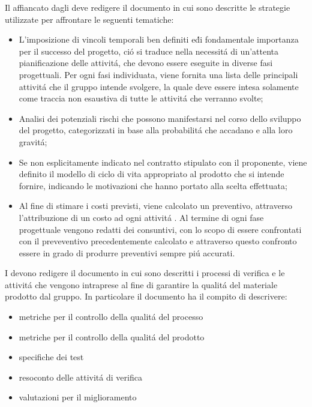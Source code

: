 Il \responsabile{} affiancato dagli \amministratori{} deve redigere il documento \PdPv{} in cui sono descritte le strategie utilizzate per affrontare le seguenti tematiche:

\begin{itemize}
    \item L'imposizione di vincoli temporali ben definiti e\' di fondamentale importanza per il successo del progetto, ci\'o si traduce nella necessit\'a di un'attenta pianificazione delle attivit\'a, che devono essere eseguite in diverse fasi progettuali. Per ogni fasi individuata, viene fornita una lista delle principali attivit\'a che il gruppo intende svolgere, la quale deve essere intesa solamente come traccia non esaustiva di tutte le attivit\'a che verranno svolte;
    \item Analisi dei potenziali rischi che possono manifestarsi nel corso dello sviluppo del progetto, categorizzati in base alla probabilit\'a che accadano e alla loro gravit\'a;
    \item Se non esplicitamente indicato nel contratto stipulato con il proponente, viene definito il modello di ciclo di vita appropriato al prodotto che si intende fornire, indicando le motivazioni che hanno portato alla scelta effettuata;
    \item Al fine di stimare i costi previsti, viene calcolato un preventivo, attraverso l'attribuzione di un costo ad ogni attivit\'a . Al termine di ogni fase progettuale vengono redatti dei consuntivi, con lo scopo di essere confrontati con il preveventivo precedentemente calcolato e attraverso questo confronto essere in grado di produrre preventivi sempre pi\'u accurati.
\end{itemize}

I \verificatori{} devono redigere il documento \PdQv{} in cui sono descritti i processi di verifica e le attivit\'a che vengono intraprese al fine di garantire la qualit\'a del materiale prodotto dal gruppo. In particolare il documento ha il compito di descrivere:

\begin{itemize}
    \item metriche per il controllo della qualit\'a del processo
    \item metriche per il controllo della qualit\'a del prodotto
    \item specifiche dei test
    \item resoconto delle attivit\'a di verifica
    \item valutazioni per il miglioramento
\end{itemize}